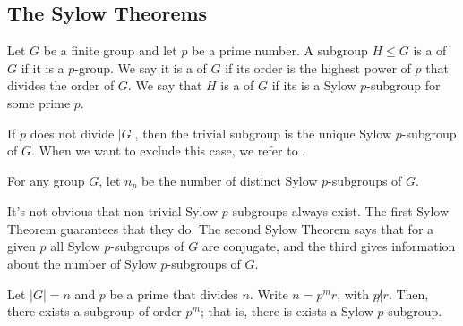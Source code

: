\subsection{The Sylow Theorems}

\begin{definition}\label{def:group-theory:sylow-subgroup}
  Let \(G\) be a finite group and let \(p\) be a prime number. A subgroup \(H \leq G\) is a  of \(G\) if it is a \(p\)-group. We say it is a  of \(G\) if its order is the highest power of \(p\) that divides the order of \(G\). We say that \(H\) is a  of \(G\) if its is a Sylow \(p\)-subgroup for some prime \(p\).
\end{definition}

If \(p\) does not divide \(|G|\), then the trivial subgroup is the unique Sylow \(p\)-subgroup of \(G\). When we want to exclude this case, we refer to .

\begin{definition}
  For any group \(G\), let \(n_{p}\) be the number of distinct Sylow \(p\)-subgroups of \(G\).
\end{definition}

It's not obvious that non-trivial Sylow \(p\)-subgroups always exist. The first Sylow Theorem guarantees that they do. The second Sylow Theorem says that for a given \(p\) all Sylow \(p\)-subgroups of \(G\) are conjugate, and the third gives information about the number of Sylow \(p\)-subgroups of \(G\).

\begin{theorem}[Sylow 1]\label{thm:group-theory:Sylow-1}
  Let \(|G| = n\) and \(p\) be a prime that divides \(n\). Write \(n = p^{m}r\), with \(p \not| r\). Then, there exists a subgroup of order \(p^{m}\); that is, there is exists a Sylow \(p\)-subgroup.
\end{theorem}

